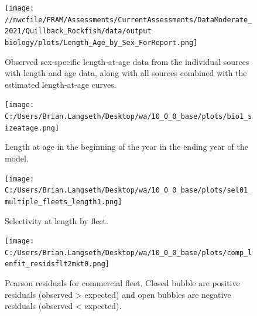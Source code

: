 \documentclass[11pt,
  english,
  a4paper,
]{article}
\begin{document}
\begin{figure}
\centering
\texttt{[image: //nwcfile/FRAM/Assessments/CurrentAssessments/DataModerate\_2021/Quillback\_Rockfish/data/output biology/plots/Length\_Age\_by\_Sex\_ForReport.png]}
\caption{Observed sex-specific length-at-age data from the individual sources with length and age data, along with all sources combined with the estimated length-at-age curves.\label{fig:len-age-data}}
\end{figure}

\tagmcend\tagstructend


\begin{figure}
\centering
\texttt{[image: C:/Users/Brian.Langseth/Desktop/wa/10\_0\_0\_base/plots/bio1\_sizeatage.png]}
\caption{Length at age in the beginning of the year in the ending year of the model.\label{fig:len-age-ss}}
\end{figure}

\tagmcend\tagstructend


\begin{figure}
\centering
\texttt{[image: C:/Users/Brian.Langseth/Desktop/wa/10\_0\_0\_base/plots/sel01\_multiple\_fleets\_length1.png]}
\caption{Selectivity at length by fleet.\label{fig:selex}}
\end{figure}

\tagmcend\tagstructend


\begin{figure}
\centering
\texttt{[image: C:/Users/Brian.Langseth/Desktop/wa/10\_0\_0\_base/plots/comp\_lenfit\_residsflt2mkt0.png]}
\caption{Pearson residuals for commercial fleet. Closed bubble are positive residuals (observed \textgreater{} expected) and open bubbles are negative residuals (observed \textless{} expected).\label{fig:com-pearson}}
\end{figure}

\tagmcend\tagstructend

\end{document}
